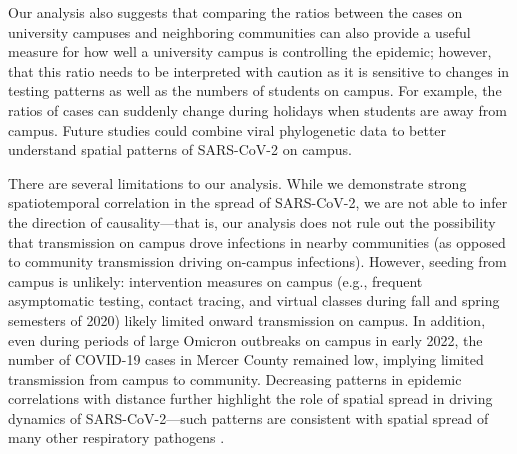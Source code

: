 \documentclass[12pt]{article}
\begin{document}
Our analysis also suggests that comparing the ratios between the cases on university campuses and neighboring communities can also provide a useful measure for how well a university campus is controlling the epidemic; 
however, that this ratio needs to be interpreted with caution as it is sensitive to changes in testing patterns as well as the numbers of students on campus.
For example, the ratios of cases can suddenly change during holidays when students are away from campus.
Future studies could combine viral phylogenetic data to better understand spatial patterns of SARS-CoV-2 on campus.

There are several limitations to our analysis.
While we demonstrate strong spatiotemporal correlation in the spread of SARS-CoV-2, we are not able to infer the direction of causality---that is, our analysis does not rule out the possibility that transmission on campus drove infections in nearby communities (as opposed to community transmission driving on-campus infections).
However, seeding from campus is unlikely: 
intervention measures on campus (e.g., frequent asymptomatic testing, contact tracing, and virtual classes during fall and spring semesters of 2020) likely limited onward transmission on campus.
In addition, even during periods of large Omicron outbreaks on campus in early 2022, the number of COVID-19 cases in Mercer County remained low, implying limited transmission from campus to community.
Decreasing patterns in epidemic correlations with distance further highlight the role of spatial spread in driving dynamics of SARS-CoV-2---such patterns are consistent with spatial spread of many other respiratory pathogens \citep{grenfell2001travelling, viboud2006synchrony, baker2019epidemic}.
\end{document}
